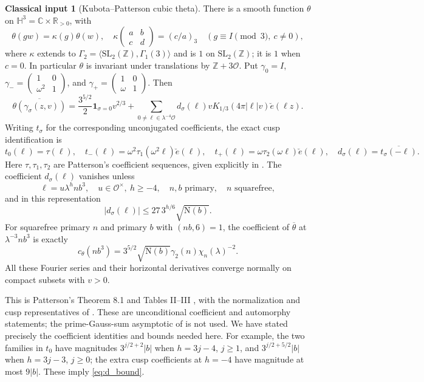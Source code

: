 \documentclass[11pt,a4paper]{article}
\numberwithin{equation}{section}
\theoremstyle{definition}
\newtheorem{inputthm}[theorem]{Classical input}
\theoremstyle{remark}
\newcommand{\C}{\mathbb C}
\newcommand{\R}{\mathbb R}
\newcommand{\Z}{\mathbb Z}
\newcommand{\OO}{\mathcal O}
\newcommand{\N}{\mathrm N}
\newcommand{\ind}{\mathbf 1}
\newcommand{\ve}{\breve e}
\begin{document}
\begin{inputthm}[Kubota--Patterson cubic theta]\label{inp:theta}
There is a smooth function $\theta$ on $\mathbb H^3=\C\times\R_{>0}$, with
\[
 \theta(gw)=\kappa(g)\theta(w),\quad
 \kappa\begin{pmatrix}a&b\\c&d\end{pmatrix}=(c/a)_3\quad(g\equiv I\pmod3,\ c\ne0),
\]
where $\kappa$ extends to $\Gamma_2=\langle\mathrm{SL}_2(\Z),\Gamma_1(3)\rangle$ and is $1$ on $\mathrm{SL}_2(\Z)$; it is $1$ when $c=0$. In particular $\theta$ is invariant under translations by $\Z+3\OO$.
Put $\gamma_0=I$, $\gamma_-={\left(\begin{smallmatrix}1&0\\\omega^2&1\end{smallmatrix}\right)}$, and $\gamma_+={\left(\begin{smallmatrix}1&0\\\omega&1\end{smallmatrix}\right)}$. Then
\begin{equation}\label{eq:thetaexp}
 \overline{\theta(\gamma_\sigma(z,v))}
 =\frac{3^{5/2}}2\ind_{\sigma=0}v^{2/3}
 +\sum_{0\ne\ell\in\lambda^{-4}\OO}d_\sigma(\ell)vK_{1/3}(4\pi|\ell|v)\ve(\ell z).
\end{equation}
Writing $t_\sigma$ for the corresponding unconjugated coefficients, the exact cusp identification is
\[
 t_0(\ell)=\tau(\ell),\quad
 t_-(\ell)=\omega^2\tau_1(\omega^2\ell)\ve(\ell),\quad
 t_+(\ell)=\omega\tau_2(\omega\ell)\ve(\ell),\quad
 d_\sigma(\ell)=\overline{t_\sigma(-\ell)}.
\]
Here $\tau,\tau_1,\tau_2$ are Patterson's coefficient sequences, given explicitly in \cite[(5.7), (5.13), (5.14)]{DR}. The coefficient $d_\sigma(\ell)$ vanishes unless
\[
 \ell=u\lambda^hnb^3,\quad u\in\OO^\times,\ h\ge-4,\quad n,b\text{ primary},\quad n\text{ squarefree},
\]
and in this representation
\begin{equation}\label{eq:d_bound}
 |d_\sigma(\ell)|\le27\,3^{h/6}\sqrt{\N(b)}.
\end{equation}
For squarefree primary $n$ and primary $b$ with $(nb,6)=1$, the coefficient of $\overline\theta$ at $\lambda^{-3}nb^3$ is exactly
\begin{equation}\label{eq:sourcecoeff}
 c_\theta(nb^3)=3^{5/2}\sqrt{\N(b)}\gamma_2(n)\chi_n(\lambda)^{-2}.
\end{equation}
All these Fourier series and their horizontal derivatives converge normally on compact subsets with $v>0$.
\end{inputthm}
This is Patterson's Theorem 8.1 and Tables II--III \cite{Patterson}, with the normalization and cusp representatives of \cite[(5.4)--(5.15), Appendix A]{DR}. These are unconditional coefficient and automorphy statements; the prime-Gauss-sum asymptotic of \cite{DR} is not used. We have stated precisely the coefficient identities and bounds needed here. For example, the two families in $t_0$ have magnitudes $3^{j/2+2}|b|$ when $h=3j-4$, $j\ge1$, and $3^{j/2+5/2}|b|$ when $h=3j-3$, $j\ge0$; the extra cusp coefficients at $h=-4$ have magnitude at most $9|b|$. These imply \eqref{eq:d_bound}.
\end{document}
